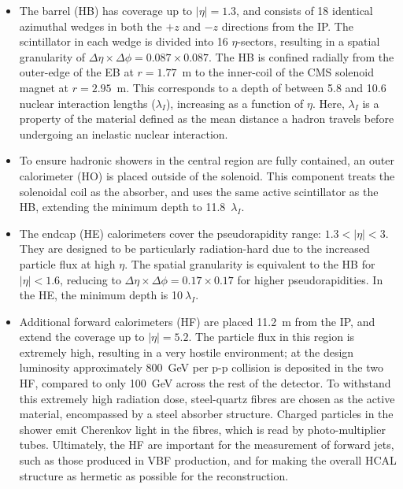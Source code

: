 \begin{itemize}
    \item The barrel (HB) has coverage up to $|\eta|=1.3$, and consists of 18 identical azimuthal wedges in both the $+z$ and $-z$ directions from the IP. The scintillator in each wedge is divided into 16 $\eta$-sectors, resulting in a spatial granularity of $\Delta\eta\times\Delta\phi=0.087\times0.087$. The HB is confined radially from the outer-edge of the EB at $r=1.77$~m to the inner-coil of the CMS solenoid magnet at $r=2.95$~m. This corresponds to a depth of between 5.8 and 10.6 nuclear interaction lengths ($\lambda_I$), increasing as a function of $\eta$. Here, $\lambda_I$ is a property of the material defined as the mean distance a hadron travels before undergoing an inelastic nuclear interaction.
    \item To ensure hadronic showers in the central region are fully contained, an outer calorimeter (HO) is placed outside of the solenoid. This component treats the solenoidal coil as the absorber, and uses the same active scintillator as the HB, extending the minimum depth to 11.8~$\lambda_I$.
    \item The endcap (HE) calorimeters cover the pseudorapidity range: $1.3<|\eta|<3$. They are designed to be particularly radiation-hard due to the increased particle flux at high $\eta$. The spatial granularity is equivalent to the HB for $|\eta|<1.6$, reducing to $\Delta\eta\times\Delta\phi=0.17\times0.17$ for higher pseudorapidities. In the HE, the minimum depth is 10$~\lambda_I$.
    \item Additional forward calorimeters (HF) are placed 11.2~m from the IP, and extend the coverage up to $|\eta|=5.2$. The particle flux in this region is extremely high, resulting in a very hostile environment; at the design luminosity approximately 800~GeV per p-p collision is deposited in the two HF, compared to only 100~GeV across the rest of the detector. To withstand this extremely high radiation dose, steel-quartz fibres are chosen as the active material, encompassed by a steel absorber structure. Charged particles in the shower emit Cherenkov light in the fibres, which is read by photo-multiplier tubes. Ultimately, the HF are important for the measurement of forward jets, such as those produced in VBF production, and for making the overall HCAL structure as hermetic as possible for the \met reconstruction.
\end{itemize}

